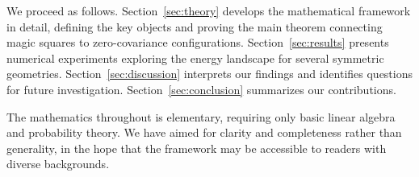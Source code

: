 We proceed as follows. Section~\ref{sec:theory} develops the mathematical framework in detail, defining the key objects and proving the main theorem connecting magic squares to zero-covariance configurations. Section~\ref{sec:results} presents numerical experiments exploring the energy landscape for several symmetric geometries. Section~\ref{sec:discussion} interprets our findings and identifies questions for future investigation. Section~\ref{sec:conclusion} summarizes our contributions.

The mathematics throughout is elementary, requiring only basic linear algebra and probability theory. We have aimed for clarity and completeness rather than generality, in the hope that the framework may be accessible to readers with diverse backgrounds.

